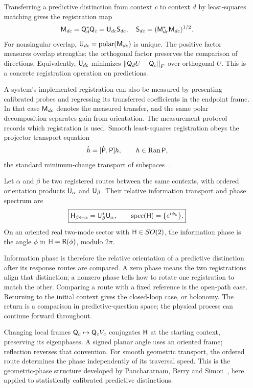 Transferring a predictive distinction from context \(c\) to context \(d\) by least-squares matching gives the registration map
\begin{equation}
\mathsf M_{dc}=\mathsf Q_d^*\mathsf Q_c=\mathsf U_{dc}\mathsf S_{dc},
\quad
\mathsf S_{dc}=(\mathsf M_{dc}^*\mathsf M_{dc})^{1/2}.
\label{eq:registration}
\end{equation}
For nonsingular overlap, \(\mathsf U_{dc}=\operatorname{polar}(\mathsf M_{dc})\) is unique. The positive factor measures overlap strengths; the orthogonal factor preserves the comparison of directions. Equivalently, \(\mathsf U_{dc}\) minimizes \(\left\lVert\mathsf Q_dU-\mathsf Q_c\right\rVert_F\) over orthogonal \(U\). This is a concrete registration operation on predictions.

A system's implemented registration can also be measured by presenting calibrated probes and regressing its transferred coefficients in the endpoint frame. In that case \(\mathsf M_{dc}\) denotes the measured transfer, and the same polar decomposition separates gain from orientation. The measurement protocol records which registration is used. Smooth least-squares registration obeys the projector transport equation
\begin{equation*}
\dot h=[\dot{\mathsf P},\mathsf P]h,
\qquad h\in\operatorname{Ran}\mathsf P,
\end{equation*}
the standard minimum-change transport of subspaces~\citep{bendokat2023}.

\begin{definition}
\label{def:phase}
Let \(\alpha\) and \(\beta\) be two registered routes between the same contexts, with ordered orientation products \(\mathsf U_\alpha\) and \(\mathsf U_\beta\). Their relative information transport and phase spectrum are
\begin{equation}
\boxed{\mathsf H_{\beta\leftarrow\alpha}=\mathsf U_\beta^*\mathsf U_\alpha,
\qquad\operatorname{spec}(\mathsf H)=\{e^{i\phi_k}\}.}
\label{eq:phase}
\end{equation}
On an oriented real two-mode sector with \(\mathsf H\in SO(2)\), the information phase is the angle \(\phi\) in \(\mathsf H=\mathsf R(\phi)\), modulo \(2\pi\).
\end{definition}

Information phase is therefore the relative orientation of a predictive distinction after its response routes are compared. A zero phase means the two registrations align that distinction; a nonzero phase tells how to rotate one registration to match the other. Comparing a route with a fixed reference is the open-path case. Returning to the initial context gives the closed-loop case, or holonomy. The return is a comparison in predictive-question space; the physical process can continue forward throughout.

Changing local frames \(\mathsf Q_c\mapsto\mathsf Q_cV_c\) conjugates \(\mathsf H\) at the starting context, preserving its eigenphases. A signed planar angle uses an oriented frame; reflection reverses that convention. For smooth geometric transport, the ordered route determines the phase independently of its traversal speed. This is the geometric-phase structure developed by Pancharatnam, Berry and Simon~\citep{pancharatnam1956,berry1984,simon1983}, here applied to statistically calibrated predictive distinctions.
